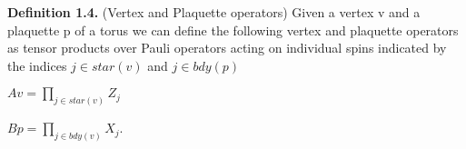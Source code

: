 \documentclass[12pt]{report}
\begin{document}
\begin{minipage}{1\textwidth}
		\textbf{Definition 1.4.} (Vertex and Plaquette operators) Given a vertex v and a plaquette p of a torus we can define the following vertex and plaquette operators as tensor products over Pauli operators acting on individual spins indicated by the indices $j \in star(v)$ and $j \in bdy(p)$  \newline 
		
		\begin{center}
			$ Av = \prod_{j \in star(v)} Z_j $ \newline
			
			$ Bp = \prod_{j \in bdy(v)} X_j $.\newline
		\end{center}
		
		
		
		
		
		
    \end{minipage}
        
\end{document}
